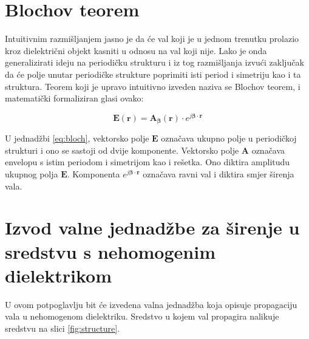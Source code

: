 \documentclass[utf8, seminar]{fer}
\begin{document}
\section{Blochov teorem}

Intuitivnim razmišljanjem jasno je da će val koji je u jednom trenutku prolazio
kroz dielektrični objekt kasniti u odnosu na val koji nije. Lako je onda
generalizirati ideju na periodičku strukturu i iz tog razmišljanja izvući
zaključak da će polje unutar periodičke strukture poprimiti isti period i
simetriju kao i ta struktura. Teorem koji je upravo intuitivno izveden naziva se
Blochov teorem, i matematički formaliziran glasi ovako:

\begin{equation} \label{eq:bloch}
	\mathbf{E}(\mathbf{r}) =
	\mathbf{A}_\mathbf{\beta}(\mathbf{r}) \cdot
		e^{j \mathbf{\beta} \cdot \mathbf{r}}
\end{equation}

U jednadžbi \ref{eq:bloch}, vektorsko polje $\mathbf{E}$ označava ukupno polje
u periodičkoj strukturi i ono se sastoji od dvije komponente. Vektorsko polje
$\mathbf{A}$ označava envelopu s istim periodom i simetrijom kao i rešetka.
Ono diktira amplitudu ukupnog polja $\mathbf{E}$.
Komponenta ${e^{j \mathbf{\beta} \cdot \mathbf{r}}}$ označava ravni val i diktira
smjer širenja vala.




\section{Izvod valne jednadžbe za širenje u sredstvu s nehomogenim dielektrikom}

U ovom potpoglavlju bit će izvedena valna jednadžba koja opisuje propagaciju
vala u nehomogenom dielektriku. Sredstvo u kojem val propagira nalikuje sredstvu
na slici \ref{fig:structure}.
\end{document}
